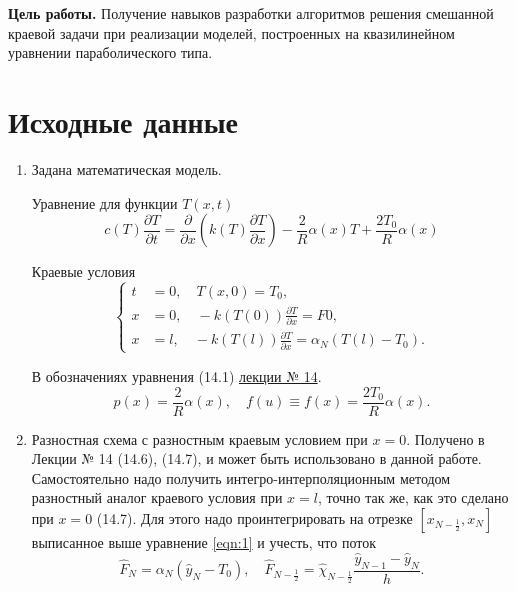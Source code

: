 \documentclass[a4paper,oneside,12pt]{extreport}
\begin{document}


\textbf{Цель работы.} Получение навыков разработки алгоритмов решения смешанной краевой задачи при реализации моделей, построенных на квазилинейном уравнении параболического типа.

\section*{Исходные данные}

\begin{enumerate}
	\item Задана математическая модель.

	Уравнение для функции $T(x, t)$
	\begin{equation}
		c(T)\frac{\partial T}{\partial t} = \frac{\partial}{\partial x} \left( k(T)\frac{\partial T}{\partial x}\right) -\frac2R\alpha(x)T+\frac{2T_0}R\alpha(x)
		\label{eqn:1}
	\end{equation}

	Краевые условия
	\begin{equation}
		\left\{
		\begin{aligned}
			t&=0,\quad T(x, 0) = T_0,\\
			x&=0,\quad-k(T(0))\frac{\partial T}{\partial x}=F0,\\
			x&=l,\quad-k(T(l))\frac{\partial T}{\partial x}=\alpha_N(T(l)-T_0).
		\end{aligned}
		\right.
	\end{equation}

	В обозначениях уравнения (14.1) \href{ftp://eufs.bmstu.ru/19426610-bd1a-11e6-93f1-005056960017/04-05-2020-%D0%9B%D0%B5%D0%BA%D1%86%D0%B8%D1%8F__14_%D0%9C%D0%BE%D0%B4%D0%B5%D0%BB%D0%B8_%D0%94%D0%A3%D0%A7%D0%9F_%D0%9C%D0%B5%D1%82%D0%BE%D0%B4%D1%8B_%D0%BF%D0%BE%D1%81%D1%82%D1%80_%D1%80%D0%B0%D0%B7%D0%BD%D0%BE%D1%81%D1%82_%D1%81%D1%85%D0%B5%D0%BC_%D0%98%D0%BD%D1%82%D0%B5%D0%B3%D1%80%D0%BE_%D0%B8%D0%BD%D1%82%D0%B5%D1%80%D0%BF.pdf}{лекции № 14}.
	\begin{equation}
		p(x) = \frac2R\alpha(x),\quad f(u)\equiv f(x) = \frac{2T_0}R\alpha(x).
		\label{eqn:3}
	\end{equation}

	\item Разностная схема с разностным краевым условием при $x=0$.
	Получено в Лекции № 14 (14.6), (14.7), и может быть использовано в данной работе.
	Самостоятельно надо получить интегро-интерполяционным методом разностный аналог краевого условия при $x=l$, точно так же, как это сделано при $x=0$ (14.7).
	Для этого надо проинтегрировать на отрезке $[x_{N-\frac12}, x_N]$ выписанное выше уравнение \eqref{eqn:1} и учесть, что поток
	\begin{equation}
		\widehat F_N=\alpha_N(\widehat y_N-T_0),\quad \widehat F_{N-\frac12}=\widehat\chi_{N-\frac12}\frac{\widehat y_{N-1}-\widehat y_N}h.
		\label{eqn:4}
	\end{equation}


\end{enumerate}
\end{document}
